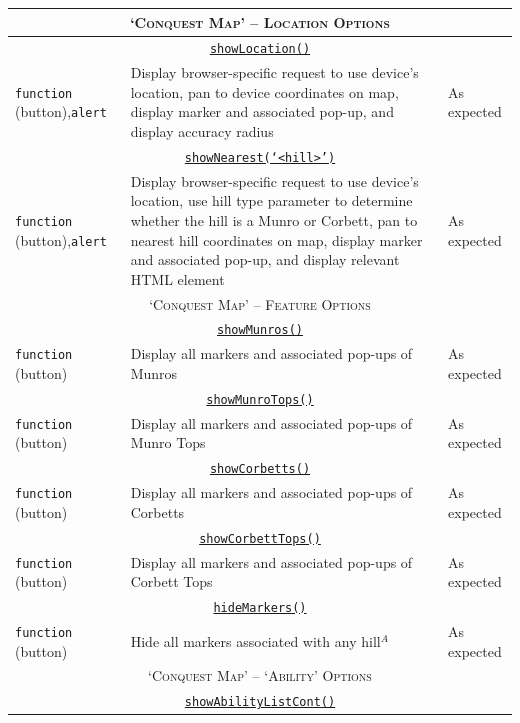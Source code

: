 \documentclass[11pt, english]{article}
\begin{document}
\begin{center}
\begin{longtable}{p{3cm}p{8cm}p{2cm}}
		\multicolumn{3}{c}{\textsc{`Conquest Map' -- Location Options}}\\
		\hline
		\multicolumn{3}{c}{\underline{\texttt{showLocation()}}}\\
		\texttt{function} (button),\newline \texttt{alert} & Display browser-specific request to use device's location, pan to device coordinates on map, display marker and associated pop-up, and display accuracy radius & As expected\\
		\multicolumn{3}{c}{\underline{\texttt{showNearest(`<hill>')}}}\\
		\texttt{function} (button),\newline \texttt{alert} & Display browser-specific request to use device's location, use hill type parameter to determine whether the hill is a Munro or Corbett, pan to nearest hill coordinates on map, display marker and associated pop-up, and display relevant HTML element & As expected\\
		\hline
		\multicolumn{3}{c}{\textsc{`Conquest Map' -- Feature Options}}\\
		\hline
		\multicolumn{3}{c}{\underline{\texttt{showMunros()}}}\\
		\texttt{function} (button) & Display all markers and associated pop-ups of Munros & As expected\\
		\multicolumn{3}{c}{\underline{\texttt{showMunroTops()}}}\\
		\texttt{function} (button) & Display all markers and associated pop-ups of Munro Tops & As expected\\
		\multicolumn{3}{c}{\underline{\texttt{showCorbetts()}}}\\
		\texttt{function} (button) & Display all markers and associated pop-ups of Corbetts & As expected\\
		\multicolumn{3}{c}{\underline{\texttt{showCorbettTops()}}}\\
		\texttt{function} (button) & Display all markers and associated pop-ups of Corbett Tops & As expected\\
		\multicolumn{3}{c}{\underline{\texttt{hideMarkers()}}}\\
		\texttt{function} (button) & Hide all markers associated with any hill$^{A}$ & As expected\\
		\hline
		\multicolumn{3}{c}{\textsc{`Conquest Map' -- `Ability' Options}}\\
		\hline
		\multicolumn{3}{c}{\underline{\texttt{showAbilityListCont()}}}\\

\end{longtable}
\end{center}
\end{document}
